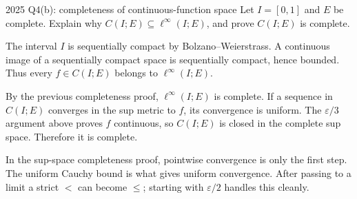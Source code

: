 \begin{exam}{2025 Q4(b): completeness of continuous-function space}
Let $I=[0,1]$ and $E$ be complete. Explain why $C(I;E)\subseteq\ell^\infty(I;E)$, and prove $C(I;E)$ is complete.
\end{exam}
\begin{answer}
The interval $I$ is sequentially compact by Bolzano--Weierstrass. A continuous image of a sequentially compact space is sequentially compact, hence bounded. Thus every $f\in C(I;E)$ belongs to $\ell^\infty(I;E)$.

By the previous completeness proof, $\ell^\infty(I;E)$ is complete. If a sequence in $C(I;E)$ converges in the sup metric to $f$, its convergence is uniform. The $\varepsilon/3$ argument above proves $f$ continuous, so $C(I;E)$ is closed in the complete sup space. Therefore it is complete.
\end{answer}
\begin{tip}
In the sup-space completeness proof, pointwise convergence is only the first step. The uniform Cauchy bound is what gives uniform convergence. After passing to a limit a strict $<$ can become $\le$; starting with $\varepsilon/2$ handles this cleanly.
\end{tip}


